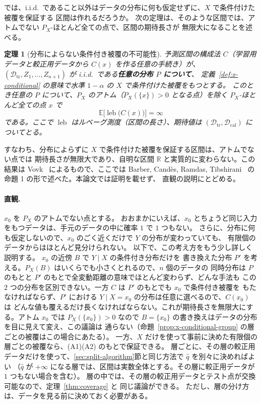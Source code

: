 \documentclass[a4paper,11pt]{jsarticle}
\theoremstyle{definition}
\theoremstyle{plain}
\newtheorem{theorem}[definition]{定理}
\theoremstyle{remark}
\newcommand{\Exp}{\mathbb{E}}
\newcommand{\Real}{\mathbb{R}}
\newcommand{\Dtr}{\mathcal{D}_{\mathrm{tr}}}     %
\newcommand{\Dcal}{\mathcal{D}_{\mathrm{cal}}}   %
\newcommand{\qhat}{\hat{q}}
\begin{document}
では、i.i.d.\ であること以外はデータの分布に何も仮定せずに、$X$ で条件付けた被覆を保証する
区間は作れるだろうか。
次の定理は、そのような区間では、アトムでない $P_X$-ほとんど全ての点で、区間の期待長さが
無限大になることを述べる。

\begin{theorem}[分布によらない条件付き被覆の不可能性]
  \label{thm:x-conditional-impossible}
  予測区間の構成法 $C$（学習用データと較正用データから $C(x)$ を作る任意の手続き）が、
  $(\Dtr,Z_1,\dots,Z_{n+1})$ が i.i.d.\ である\textbf{任意の分布 $P$ について}、
  定義~\ref{def:x-conditional} の意味で水準 $1-\alpha$ の $X$ で条件付けた被覆をもつとする。
  このとき任意の $P$ について、$P_X$ のアトム（$P_X(\{x\})>0$ となる点）を除く
  $P_X$-ほとんど全ての点 $x$ で
  \begin{equation*}
    \Exp\bigl[\operatorname{leb}\bigl(C(x)\bigr)\bigr]=\infty
  \end{equation*}
  である。ここで $\operatorname{leb}$ はルベーグ測度（区間の長さ）、期待値は $(\Dtr,\Dcal)$ に
  ついてとる。
\end{theorem}

すなわち、分布によらずに $X$ で条件付けた被覆を保証する区間は、アトムでない点では
期待長さが無限大であり、自明な区間 $\Real$ と実質的に変わらない。この結果は
Vovk~\cite{vovk2012conditional} によるもので、ここでは Barber, Cand\`es, Ramdas,
Tibshirani~\cite{barber2021limits} の命題 1 の形で述べた。本論文では証明を載せず、
直観の説明にとどめる。

\paragraph{直観.}
$x_0$ を $P_X$ のアトムでない点とする。
おおまかにいえば、$x_0$ とちょうど同じ入力をもつデータは、手元のデータの中に確率 $1$ で
$1$ つもない。
さらに、分布に何も仮定しないので、$x_0$ のごく近くだけで $Y$ の分布が変わっていても、
有限個のデータからはほとんど見分けられない。
以下で、この考え方をもう少し詳しく説明する。
$x_0$ の近傍 $B$ で $Y\mid X$ の条件付き分布だけを
書き換えた分布 $P'$ を考える。$P_X(B)$ はいくらでも小さくとれるので、$n$ 個のデータの
同時分布は $P$ のもとと $P'$ のもとで全変動距離の意味でほとんど変わらず、どんな手法も
この $2$ つの分布を区別できない。一方 $C$ は $P'$ のもとでも $x_0$ で条件付き被覆を
もたなければならず、$P'$ における $Y\mid X=x_0$ の分布は任意に選べるので、$C(x_0)$ は
どんな値も覆えるだけ長くなければならない。これが期待長さを無限大にする。アトム $x_0$ では
$P_X(\{x_0\})>0$ なので $B=\{x_0\}$ の書き換えはデータの分布を目に見えて変え、この議論は
通らない（命題~\ref{prop:x-conditional-group} の層ごとの被覆はこの場合にあたる）。
一方、$X$ だけを使って事前に決めた有限個の層ごとの被覆なら、(A1)(A2) のもとで保証できる。
層ごとに、その層の較正用データだけを使って、\ref{sec:split-algorithm}節と同じ方法で
$\qhat$ を別々に決めればよい
（$\qhat$ が $+\infty$ になる層では、区間は実数全体とする。その層に較正用データが
$1$ つもない場合を含む）。
層の中では、その層の較正用データとテスト点が交換可能なので、定理~\ref{thm:coverage} と
同じ議論ができる。
ただし、層の分け方は、データを見る前に決めておく必要がある。
\end{document}
